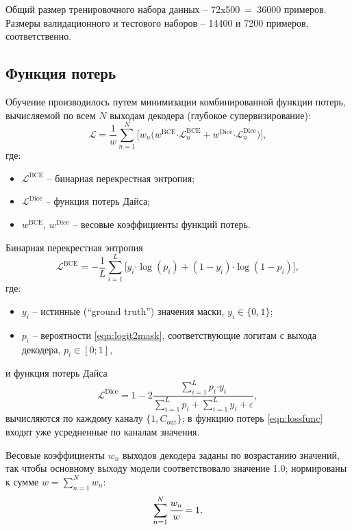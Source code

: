 Общий размер тренировочного набора данных -- 72x500~=~\num{36000} примеров. Размеры валидационного и тестового наборов -- \num{14400} и \num{7200} примеров, соответственно.

\subsection{Функция потерь}
Обучение производилось путем минимизации комбинированной функции потерь, вычисляемой по всем $N$ выходам декодера (глубокое супервизирование):
\begin{equation}\label{eqn:lossfunc}
    \mathcal{L} = \frac{1}{w} {\sum_{n=1}^{N} \Big[ w_n \Big( w^\text{BCE} \mathord{\cdot} \mathcal{L}_n^\text{BCE} + w^\text{Dice} \mathord{\cdot} \mathcal{L}_n^\text{Dice}} \Big) \Big],
\end{equation}
где:
\begin{itemize}
    \item ${\mathcal{L}^\text{BCE}}$ -- бинарная перекрестная энтропия;
    \item ${\mathcal{L}^\text{Dice}}$ -- функция потерь Дайса;
    \item ${w^\text{BCE}}$, ${w^\text{Dice}}$ -- весовые коэффициенты функций потерь.
\end{itemize}

Бинарная перекрестная энтропия
\begin{equation*}
    \mathcal{L}^\text{BCE} = -\frac{1}{L} \sum_{i=1}^{L} \Big[ y_i \mathord{\cdot} \log\left(p_i \right) + \left(1 - y_i\right) \mathord{\cdot} \log \left( 1 - p_i \right) \Big],
\end{equation*}
где:
\begin{itemize}
    \item ${y_i}$ -- истинные (\enquote{ground truth}) значения маски, ${y_i \in \{0, 1\}}$;
    \item ${p_i}$ -- вероятности \eqref{eqn:logit2mask}, соответствующие логитам с выхода декодера, ${p_i \in \left[0; 1 \right]}$,
\end{itemize}
и функция потерь Дайса
\begin{equation*}
    \mathcal{L}^{\text{Dice}} = 1 - 2 \frac{\sum_{i=1}^{L} p_i \mathord{\cdot} y_i}{\sum_{i=1}^{L} p_i + \sum_{i=1}^{L} y_i + \varepsilon},
\end{equation*}
вычисляются по каждому каналу $\{1, C_\text{out}\}$; в функцию потерь \eqref{eqn:lossfunc} входят уже усредненные по каналам значения.

Весовые коэффициенты ${w_n}$ выходов декодера заданы по возрастанию значений, так чтобы основному выходу модели соответствовало значение \num{1.0}; нормированы к сумме ${w = \sum_{n=1}^{N} w_n}$:
\begin{equation*}
    \displaystyle\sum_{n=1}^{N} \cfrac{w_n}{w} = 1.
\end{equation*}

